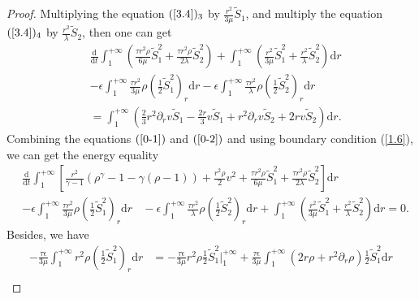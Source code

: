 \documentclass[10pt,reqno]{amsart}
\numberwithin{equation}{section}
\begin{document}
\begin{proof}
		Multiplying the equation $(\ref{3.4})_3$ by $\frac{r^2}{3 \mu}\tilde{S}_1$, and multiply the equation $(\ref{3.4})_4$ by $\frac{r^2}{\lambda} \tilde{S}_2$, then one can get
		\begin{equation}
			\begin{aligned}\label{0-2}
				&\frac{\mathrm{d}}{\mathrm{d} t} \int_{1}^{+\infty}\left(\frac{\tau   r^2 \rho}{6 \mu}   \tilde{S}_1^2+\frac{\tau  r^2 \rho}{2\lambda}  \tilde{S}_2^2\right)+\int_{1}^{+\infty} (\frac{r^2}{3 \mu}  \tilde{S}_1^2+\frac{r^2}{\lambda} \tilde{S}_2^2) \mathrm{d} r\\
				&-\epsilon\int_{1}^{+\infty}\frac{\tau   r^2}{3 \mu}  \rho \left(\frac{1}{2}\tilde{S}_1^2\right)_r\mathrm{d} r -\epsilon\int_{1}^{+\infty}\frac{\tau  r^2}{\lambda}  \rho \left(\frac{1}{2}\tilde{S}_2^2\right)_r\mathrm{d} r\\
				&=\int_{1}^{+\infty}(\frac{2}{3}r^2\partial_{r}v\tilde{S}_1-\frac{2r}{3}v\tilde{S}_1+r^2\partial_{r}v\tilde{S}_2+2rv\tilde{S}_2)\mathrm{d} r.
			\end{aligned}
		\end{equation}
		Combining the equations $(\ref{0-1})$ and $(\ref{0-2})$ and using boundary condition (\ref{1.6}), we can get the energy equality
		\begin{equation}
			\begin{aligned}
				&\frac{\mathrm{d}}{\mathrm{d} t} \int_{1}^{+\infty}\left[\frac{r^2}{\gamma-1}(\rho^{\gamma}-1-\gamma(\rho-1))+\frac{r^2 \rho}{2} v^2+\frac{\tau   r^2 \rho}{6 \mu}   \tilde{S}_1^2+\frac{\tau  r^2 \rho}{2\lambda}  \tilde{S}_2^2\right] \mathrm{d} r\\
				&-\epsilon\int_{1}^{+\infty}\frac{\tau   r^2}{3 \mu}  \rho \left(\frac{1}{2}\tilde{S}_1^2\right)_r\mathrm{d} r
				~~~~ -\epsilon\int_{1}^{+\infty}\frac{\tau  r^2}{\lambda}  \rho \left(\frac{1}{2}\tilde{S}_2^2\right)_r\mathrm{d} r +\int_{1}^{+\infty} (\frac{r^2}{3 \mu}  \tilde{S}_1^2+\frac{r^2}{\lambda} 
				\tilde{S}_2^2) \mathrm{d} r=0.
			\end{aligned}
		\end{equation}
		Besides, we have 
		\begin{equation}\nonumber
			\begin{aligned}
				-\frac{\tau \epsilon}{3 \mu} \int_{1}^{+\infty} r^2\rho \left(\frac{1}{2}\tilde{S}_1^2\right)_r\mathrm{d} r
				&=-\frac{\tau   \epsilon}{3 \mu}r^2\rho \frac{1}{2}\tilde{S}_1^2 \bigg|_1^{+\infty} +\frac{\tau \epsilon}{3 \mu} \int_{1}^{+\infty}(2r\rho+r^2\partial_{r}\rho)\frac{1}{2}\tilde{S}_1^2\mathrm{d} r\\

\end{aligned}
\end{equation}
\end{proof}
\end{document}
